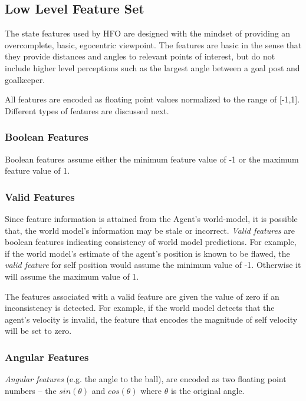 \documentclass[12pt]{article}
\begin{document}
\subsection {Low Level Feature Set}
The state features used by HFO are designed with the mindset of
providing an overcomplete, basic, egocentric viewpoint. The features
are basic in the sense that they provide distances and angles to
relevant points of interest, but do not include higher level
perceptions such as the largest angle between a goal post and
goalkeeper.

All features are encoded as floating point values normalized to the
range of [-1,1]. Different types of features are discussed next.

\subsubsection{Boolean Features}

Boolean features assume either the minimum feature value of -1 or the
maximum feature value of 1.

\subsubsection{Valid Features}

Since feature information is attained from the Agent's world-model, it
is possible that, the world model's information may be stale or
incorrect. \textit{Valid features} are boolean features indicating
consistency of world model predictions. For example, if the world
model's estimate of the agent's position is known to be flawed, the
\textit{valid feature} for self position would assume the minimum
value of -1. Otherwise it will assume the maximum value of 1.

The features associated with a valid feature are given the value of
zero if an inconsistency is detected. For example, if the world model
detects that the agent's velocity is invalid, the feature that encodes
the magnitude of self velocity will be set to zero.

\subsubsection{Angular Features}

\textit{Angular features} (e.g. the angle to the ball), are encoded as two
floating point numbers -- the $sin(\theta)$ and $cos(\theta)$ where
$\theta$ is the original angle.
\end{document}
